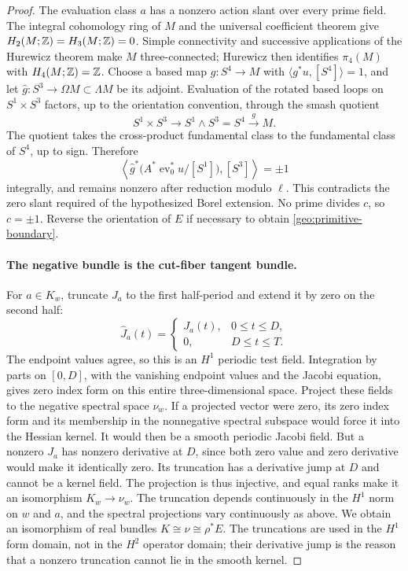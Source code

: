 \begin{proof}
The evaluation class $a$ has a nonzero action slant over every
prime field.  The integral cohomology ring of $M$ and the
universal coefficient theorem give $H_2(M;\mathbb Z)=H_3(M;\mathbb Z)=0$.
Simple connectivity and successive applications of the Hurewicz
theorem \citep[Theorem~4.32]{Hatcher2002} make $M$
three-connected; Hurewicz then identifies
$\pi_4(M)$ with $H_4(M;\mathbb Z)=\mathbb Z$.
Choose a based map $g:S^4\to M$ with
$\langle g^*u,[S^4]\rangle=1$, and let
$\widehat g:S^3\to\Omega M\subset\Lambda M$ be its adjoint.
Evaluation of the rotated based loops on $S^1\times S^3$
factors, up to the orientation convention, through the smash
quotient
\[
 S^1\times S^3\longrightarrow S^1\wedge S^3=S^4
 \xrightarrow{\ g\ }M.
\]
The quotient takes the cross-product fundamental class to the
fundamental class of $S^4$, up to sign.  Therefore
\[
 \left\langle\widehat g^*
       \big(A^*\operatorname{ev}_0^*u/[S^1]\big),[S^3]\right\rangle
 =\pm1
\]
integrally, and remains nonzero after reduction modulo $\ell$.
This contradicts the zero slant required of the hypothesized
Borel extension.  No prime divides $c$, so $c=\pm1$.
Reverse the orientation of $E$ if necessary to obtain
\eqref{geo:primitive-boundary}.

\paragraph{The negative bundle is the cut-fiber tangent bundle.}
For $a\in K_w$, truncate $J_a$ to the first half-period and
extend it by zero on the second half:
\[
 \widehat J_a(t)=
 \begin{cases}
 J_a(t),&0\le t\le D,\\
 0,&D\le t\le T.
 \end{cases}
\]
The endpoint values agree, so this is an $H^1$ periodic test
field.  Integration by parts on $[0,D]$, with the vanishing
endpoint values and the Jacobi equation, gives zero index form
on this entire three-dimensional space.  Project these fields
to the negative spectral space $\nu_w$.  If a projected vector
were zero, its zero index form and its membership in the
nonnegative spectral subspace would force it into the Hessian
kernel.  It would then be a smooth periodic Jacobi field.
But a nonzero $J_a$ has nonzero derivative at $D$, since both
zero value and zero derivative would make it identically zero.
Its truncation has a derivative jump at $D$ and cannot be a
kernel field.  The projection is thus injective, and equal ranks
make it an isomorphism $K_w\to\nu_w$.
The truncation depends continuously in the $H^1$ norm on $w$
and $a$, and the spectral projections vary continuously as
above.  We obtain an isomorphism of real bundles
$K\cong\nu\cong\rho^*E$.
The truncations are used in the $H^1$ form domain, not in the
$H^2$ operator domain; their derivative jump is the reason
that a nonzero truncation cannot lie in the smooth kernel.


\end{proof}
